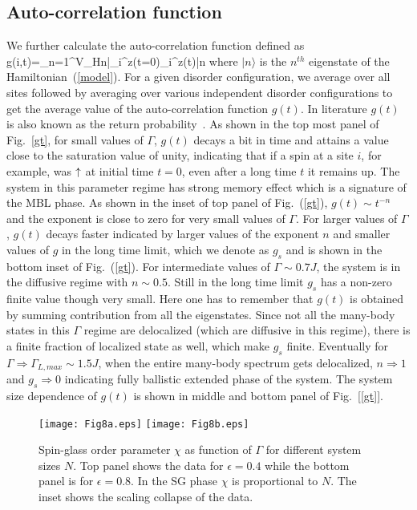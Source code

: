 \documentclass[prl,aps,twocolumn,floats,nofootinbib]{revtex4}
\begin{document}
\subsection{Auto-correlation function}
We further calculate the auto-correlation function defined as 
\be
g(i,t)=\sum_{n=1}^{V_H}\langle n|\sigma_i^z(t=0)\sigma_i^z(t)|n\rangle
\ee
where $|n\rangle$ is the $n^{th}$ eigenstate of the Hamiltonian~(\ref{model}). For a given disorder configuration, we average over all sites followed by averaging over various independent disorder configurations to get the average value of the auto-correlation function $g(t)$. In literature $g(t)$ is also known as the return probability~\cite{Subroto,Agarwal2,garg}. As shown in the top most panel of Fig.~\ref{gt}, for small values of $\Gamma$, $g(t)$ decays a bit in time and attains a value close to the saturation value of unity, indicating that if a spin at a site $i$, for example, was $\uparrow$ at initial time $t=0$, even after a long time $t$ it remains up. The system in this parameter regime has strong memory effect which is a signature of the MBL phase.
As shown in the inset of top panel of Fig.~(\ref{gt}), $g(t)\sim t^{-n}$ and the exponent is close to zero for very small values of $\Gamma$. For larger values of $\Gamma$, $g(t)$ decays faster indicated by larger values of the exponent $n$ and smaller values of $g$ in the long time limit, which we denote as $g_s$ and is shown in the bottom inset of Fig.~(\ref{gt}).  For intermediate values of $\Gamma \sim 0.7J$, the system is in the diffusive regime with $n\sim 0.5$. Still in the long time limit $g_s$ has a non-zero finite value though very small. Here one has to remember that $g(t)$ is obtained by summing contribution from all the eigenstates. Since not all the many-body states in this $\Gamma$ regime are delocalized (which are diffusive in this regime), there is a finite fraction of localized state as well, which make $g_s$ finite. Eventually for $\Gamma \Rightarrow \Gamma_{L,max}\sim 1.5J$, when the entire many-body spectrum gets delocalized, $n\Rightarrow 1$ and $g_s\Rightarrow 0$ indicating fully ballistic extended phase of the system.     
The system size dependence of $g(t)$ is shown in middle and bottom panel of Fig.~[\ref{gt}].

\begin{figure}[h!]
\begin{center}
\hskip-0.4cm
\texttt{[image: Fig8a.eps]}
\vskip-0.15cm
\texttt{[image: Fig8b.eps]}
\caption{ Spin-glass order parameter $\chi$ as function of $\Gamma$ for different system sizes $N$. Top panel shows the data for $\epsilon=0.4$ while the bottom panel is for $\epsilon=0.8$. In the SG phase $\chi$ is proportional to $N$. The inset shows the scaling collapse of the data.}
\label{chi_fig}
\end{center}
\end{figure}
\end{document}
